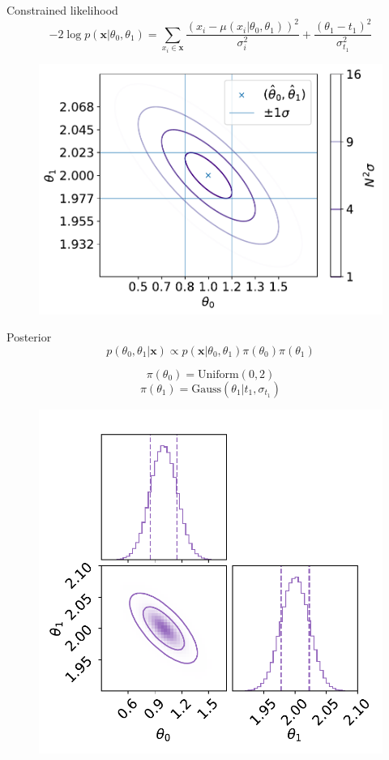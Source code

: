 \documentclass[
aspectratio=169,
14pt,
professionalfonts
]{beamer}
\begin{document}
\begin{frame}{Constrained likelihood}
\vspace{-1cm}
    $$ -2\log p(\mathbf{x}|\theta_0, \theta_1) = \sum_{x_i \in \mathbf{x}}\frac{\left(x_i -\mu(x_i|\theta_0, \theta_1)\right)^2}{\sigma_i^2} + \frac{\left(\theta_1 -t_1\right)^2}{\sigma_{t_1}^2} $$
    \begin{figure}
        \centering
        \includegraphics[width=0.5\linewidth]{../plots/nll_constr.pdf}
    \end{figure}
\end{frame}

\begin{frame}{Posterior}
\vspace{-1cm}
    $$p(\theta_0, \theta_1|\mathbf{x}) \propto p(\mathbf{x}|\theta_0, \theta_1) \pi(\theta_0)\pi(\theta_1)$$
    \begin{minipage}{0.49\linewidth}
        $$\pi(\theta_0) = \text{Uniform}(0,2)$$
        $$\pi(\theta_1) = \text{Gauss}(\theta_1 | t_1, \sigma_{t_1})$$
    \end{minipage}
    \begin{minipage}{0.49\linewidth}
    \begin{figure}
        \centering
        \includegraphics[width=0.9\linewidth]{../plots/posterior.pdf}
    \end{figure}
    \end{minipage}
\end{frame}
\end{document}
